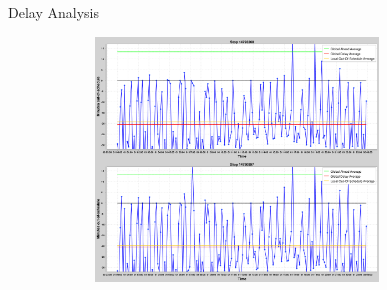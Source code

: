 \documentclass[xcolor=dvipsnames,table]{beamer}
\begin{document}
\begin{frame}{Delay Analysis}
        \begin{figure}[H]
                \centering
                \includegraphics[height=6.5cm,width=10cm]{images/stops2.png}
        \end{figure}
\end{frame}
\end{document}
